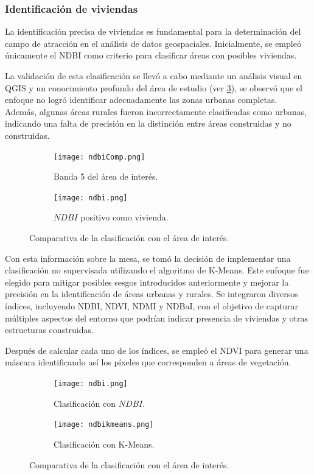 \subsubsection{Identificación de viviendas}

La identificación precisa de viviendas es fundamental para la determinación del campo de atracción en el análisis de datos geospaciales. Inicialmente, se empleó únicamente el NDBI como criterio para clasificar áreas con posibles viviendas. 

La validación de esta clasificación se llevó a cabo mediante un análisis visual en QGIS y un conocimiento profundo del área de estudio (ver \figurename \ref{fig:comparativa-ndbi}), se observó que el enfoque no logró identificar adecuadamente las zonas urbanas completas. Además, algunas áreas rurales fueron incorrectamente clasificadas como urbanas, indicando una falta de precisión en la distinción entre áreas construidas y no construidas.

\begin{figure}[!tbp]
	\begin{subfigure}[b]{0.49\textwidth}
		\texttt{[image: ndbiComp.png]}
		\caption{Banda 5 del área de interés.}
		\label{fig:f1}
	\end{subfigure}
	\hfill
	\begin{subfigure}[b]{0.49\textwidth}
		\texttt{[image: ndbi.png]}
		\caption{$NDBI$ positivo como vivienda.}
		\label{fig:f2}
	\end{subfigure}
	\caption{Comparativa de la clasificación con el área de interés.}
	\label{fig:comparativa-ndbi}
\end{figure}

Con esta información sobre la mesa, se tomó la decisión de implementar una clasificación no supervisada utilizando el algoritmo de K-Means. Este enfoque fue elegido para mitigar posibles sesgos introducidos anteriormente y mejorar la precisión en la identificación de áreas urbanas y rurales. Se integraron diversos índices, incluyendo NDBI, NDVI, NDMI y NDBaI, con el objetivo de capturar múltiples aspectos del entorno que podrían indicar presencia de viviendas y otras estructuras construidas.

Después de calcular cada uno de los índices, se empleó el NDVI para generar una máscara identificando así los píxeles que corresponden a áreas de vegetación.

\begin{figure}[H]
	\begin{subfigure}[b]{0.49\textwidth}
		\texttt{[image: ndbi.png]}
		\caption{Clasificación con $NDBI$.}
		\label{fig:ndbi-calculadora}
	\end{subfigure}
	\hfill
	\begin{subfigure}[b]{0.49\textwidth}
		\texttt{[image: ndbikmeans.png]}
		\caption{Clasificación con K-Means.}
		\label{fig:kmeans}
	\end{subfigure}
	\caption{Comparativa de la clasificación con el área de interés.}
	\label{fig:comparativa-ndbi-kmeans}
\end{figure}

